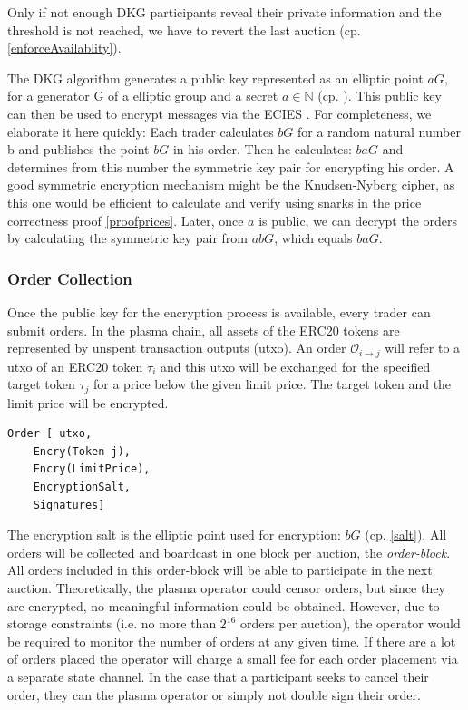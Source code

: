 \documentclass[11pt,parskip=full]{scrartcl}%
\def\pO{\mathcal{O}}
\def\ra{\rightarrow}
\newcommand*{\erc}{ERC20 }
\begin{document}
Only if not enough DKG participants reveal their private information and the threshold is not reached, we have to revert the last auction (cp. \ref{enforceAvailablity}).

The DKG algorithm generates a public key represented as an elliptic point $aG\label{public key}$, for a generator G of a elliptic group and a secret $a\in \mathbb{N}$ (cp. \cite{DKG}). 
This public key can then be used to encrypt messages via the ECIES \cite{ECIES}. 
For completeness, we elaborate it here quickly: Each trader calculates $bG \label{salt}$ for a random natural number b and publishes the point $bG$  in his order. 
Then he calculates: $baG$ and determines from this number the symmetric key pair for encrypting his order. 
A good symmetric encryption mechanism might be the Knudsen-Nyberg cipher\cite{cipher}, as this one would be efficient to calculate and verify using snarks in the price correctness proof \ref{proofprices}.
Later, once $a$ is public, we can decrypt the orders by calculating the symmetric key pair from $abG$, which equals $baG$. 


\subsubsection{Order Collection}
\label{orderblock}
Once the public key for the encryption process is available, every trader can submit orders. 
In the plasma chain, all assets of the ERC20 tokens are represented by unspent transaction outputs (utxo). 
An order $\pO_{i\ra j}$ will refer to a utxo of an \erc token $\tau_i$ and this utxo will be exchanged for the specified target token $\tau_j$ for a price below the given limit price. The target token and the limit price will be encrypted.

\begin{verbatim}
Order [ utxo,
    Encry(Token j),
    Encry(LimitPrice),
    EncryptionSalt,
    Signatures]
\end{verbatim} 
The encryption salt is the elliptic point used for encryption:  $bG$ (cp. \ref{salt}). 
All orders will be collected and boardcast in one block per auction, the \emph{order-block}. 
All orders included in this order-block will be able to participate in the next auction. 
Theoretically, the plasma operator could censor orders, but since they are encrypted, no meaningful information could be obtained.
However, due to storage constraints (i.e. no more than $2^{16}$ orders per auction), the operator would be required to monitor the number of orders at any given time.
If there are a lot of orders placed the operator will charge a small fee for each order placement via a separate state channel. 
In the case that a participant seeks to cancel their order, they can  the plasma operator or simply not double sign their order. 
\end{document}
